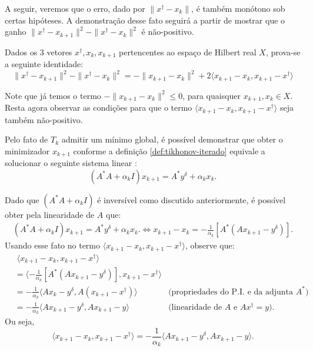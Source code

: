 A seguir, veremos que o erro, dado por $\|x^\dag - x_k\|$, é também monótono sob certas hipóteses. A demonstração desse fato seguirá a partir de mostrar que o ganho $\| x^\dag - x_{k+1}\|^2 - \| x^\dag - x_{k}\|^2 $  é não-positivo. 

Dados os 3 vetores $x^\dag, x_k, x_{k+1}$ pertencentes ao espaço de Hilbert real $X$, prova-se a seguinte identidade:
\begin{equation}\label{eq:id-ganho-tikhonov}
    \| x^\dag - x_{k+1}\|^2 - \| x^\dag - x_{k}\|^2 = - \| x_{k+1} - x_k \|^2 + 2 \langle x_{k+1} - x_k , x_{k+1} - x^\dag \rangle
\end{equation}


Note que já temos o termo $- \| x_{k+1} - x_k \|^2 \leq 0$, para quaisquer $x_{k+1},x_k \in X$. Resta agora observar as condições para que o termo $\langle x_{k+1} - x_k , x_{k+1} - x^\dag \rangle$ seja também não-positivo. 

Pelo fato de $T_k$ admitir um mínimo global, é possível demonstrar que obter o minimizador $x_{k+1}$ conforme a definição \ref{def:tikhonov-iterado} equivale a solucionar o seguinte sistema linear \cite{???}:
\begin{equation}\label{eq:sistema-tikhonov-iterado}
    (A^* A + \alpha_k I) x_{k+1} = A^* y^\delta + \alpha_k x_k.
\end{equation}

Dado que $(A^*A + \alpha_kI)$ é inversível como discutido anteriormente, é possível obter pela linearidade de $A$ que:
\begin{align} \label{eq:identidade-operador-tikhonov-iterado}
        (A^* A + \alpha_k I) x_{k+1} = A^* y^\delta + \alpha_k x_k.
        \iff x_{k+1} - x_k = - \frac{1}{\alpha_k} \left[ A^* (Ax_{k+1} - y^\delta) \right].
\end{align}
Usando esse fato no termo $\langle x_{k+1} - x_k , x_{k+1} - x^\dag \rangle$, observe que:
\begin{align*}
    &\; \langle x_{k+1} - x_k , x_{k+1} - x^\dag \rangle \\
    &= \langle - \frac{1}{\alpha_k} \left[ A^* (Ax_{k+1} - y^\delta) \right], x_{k+1} - x^\dag \rangle\\
    &= - \frac{1}{\alpha_k} \langle Ax_k - y^\delta, A(x_{k+1} - x^\dag) \rangle & \text{(propriedades do P.I. e da adjunta $A^*$)} \\
    &= - \frac{1}{\alpha_k} \langle Ax_{k+1} - y^\delta, Ax_{k+1} - y \rangle &\text{(linearidade de $A$ e $Ax^\dag = y$)}.
\end{align*}
Ou seja,
\begin{equation}
    \langle x_{k+1} - x_k , x_{k+1} - x^\dag \rangle = - \frac{1}{\alpha_k} \langle Ax_{k+1} - y^\delta, Ax_{k+1} - y \rangle.
\end{equation}

